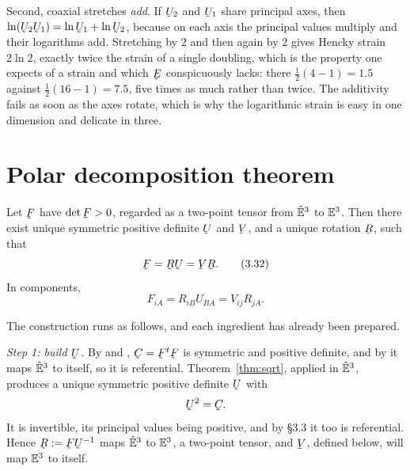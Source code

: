 \begin{remark}
Second, coaxial stretches \emph{add}. If $\bU_{2}$ and $\bU_{1}$ share
principal axes, then $\ln(\bU_{2}\bU_{1})=\ln\bU_{1}+\ln\bU_{2}$, because
on each axis the principal values multiply and their logarithms add.
Stretching by $2$ and then again by $2$ gives Hencky strain $2\ln2$,
exactly twice the strain of a single doubling, which is the property one
expects of a strain and which $\bE$ conspicuously lacks: there
$\tfrac12(4-1)=1.5$ against $\tfrac12(16-1)=7.5$, five times as much
rather than twice. The additivity fails as soon as the axes rotate, which
is why the logarithmic strain is easy in one dimension and delicate in
three.
\end{remark}

\section{Polar decomposition theorem}\label{sec:polar}

\begin{theorem}\label{thm:polar}
Let $\bF$ have $\det\bF>0$, regarded as a two-point tensor from $\hat{\mathbb{E}}^{3}$ to
$\mathbb{E}^{3}$. Then there exist unique symmetric positive definite $\bU$ and
$\bV$, and a unique rotation $\bR$, such that
\begin{equation}
   \bF=\bR\bU=\bV\bR .
   \tag{3.32}\label{eq:3.32}
\end{equation}
In components,
\begin{equation}
   F_{iA}=R_{iB}U_{BA}=V_{ij}R_{jA}.
   \tag{3.33}\label{eq:3.33}
\end{equation}
\end{theorem}

The construction runs as follows, and each ingredient has already been
prepared.

\smallskip
\noindent
\emph{Step 1: build $\bU$.} By  and , $\bC=\bF^{t}\bF$ is
symmetric and positive definite, and by  it maps $\hat{\mathbb{E}}^{3}$ to itself,
so it is referential. Theorem~\ref{thm:sqrt}, applied in $\hat{\mathbb{E}}^{3}$, produces
a unique symmetric positive definite $\bU$ with
\[
   \bU^{2}=\bC .
\]
It is invertible, its principal values being positive, and by \S3.3 it too
is referential. Hence $\bR:=\bF\bU^{-1}$ maps $\hat{\mathbb{E}}^{3}$ to $\mathbb{E}^{3}$, a two-point
tensor, and $\bV$, defined below, will map $\mathbb{E}^{3}$ to itself.

